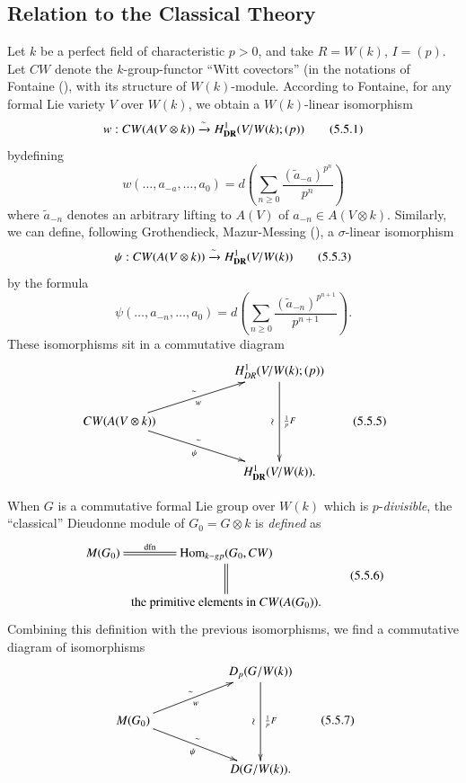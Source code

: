 \subsection{Relation to the Classical Theory}\label{art6-eq5.5}
Let $k$ be a perfect field of characteristic $p>0$, and take $R=W(k)$, $I=(p)$. Let $CW$ denote the $k$-group-functor ``Witt covectors'' (in the notations of Fontaine (\cite{art6-key13}), with its structure of $W(k)$-module. According to Fontaine, for any formal Lie variety $V$ over $W(k)$, we obtain a $W(k)$-linear isomorphism
\begin{equation*}
w:CW(A(V\otimes k))\xrightarrow{\sim}H^{1}_{\mathbf{DR}}(V/W(k);(p))\tag{5.5.1}\label{art6-eq5.5.1}
\end{equation*}
by\pageoriginale defining
\begin{equation*}
w(\ldots,a_{-a},\ldots,a_{0})=d\left(\sum\limits_{n\geq 0}\frac{(\widetilde{a}_{-a})^{p^{n}}}{p^{n}}\right)\tag{5.5.2}\label{art6-eq5.5.2}
\end{equation*}
where $\widetilde{a}_{-n}$ denotes an arbitrary lifting to $A(V)$ of $a_{-n}\in A(V\otimes k)$. Similarly, we can define, following Grothendieck, Mazur-Messing (\cite{art6-key35}), a $\sigma$-linear isomorphism
\begin{equation*}
\psi:CW(A(V\otimes k))\xrightarrow{\sim}H^{1}_{\mathbf{DR}}(V/W(k))\tag{5.5.3}\label{art6-eq5.5.3}
\end{equation*}
by the formula
\begin{equation*}
\psi(\ldots,a_{-n},\ldots,a_{0})=d\left(\sum\limits_{n\geq 0}\frac{(\widetilde{a}_{-n})^{p^{n+1}}}{p^{n+1}}\right).\tag{5.5.4}\label{art6-eq5.5.4}
\end{equation*}
These isomorphisms sit in a commutative diagram
\begin{equation*}
\vcenter{
\xymatrix@C=2cm{
 & H^{1}_{DR}(V/W(k);(p))\ar[dd]_-{\rotatebox{90}{$\sim$}}^-{\frac{1}{p}F}\\
CW(A(V\otimes k))\ar[dr]^-{\sim}_-{\psi} \ar[ur]^-{\sim}_-{w} &\\
 & H^{1}_{\DR}(V/W(k)).
}}\tag{5.5.5}\label{art6-eq5.5.5}
\end{equation*}

When $G$ is a commutative formal Lie group over $W(k)$ which is $p$-{\em divisible}, the ``classical'' Dieudonne module of $G_{0}=G\otimes k$ is {\em defined} as
\begin{equation*}
\vcenter{
\xymatrix@C=.1cm{
M(G_{0})\ar@{=}[r]^-{\text{dfn}} & \Hom_{k-gp}(G_{0},CW)\ar@{=}[d]\\
 & \text{the primitive elements in $CW(A(G_{0}))$.}
}}\tag{5.5.6}\label{art6-eq5.5.6}
\end{equation*}
Combining this definition with the previous isomorphisms, we find a commutative diagram of isomorphisms
\begin{equation*}
\vcenter{
\xymatrix@C=2cm{
 & D_{p}(G/W(k))\ar[dd]_-{\rotatebox{90}{$\sim$}}^-{\frac{1}{p}F}\\
M(G_{0})\ar[dr]^-{\sim}_-{\psi} \ar[ur]^-{\sim}_-{w} &\\
 & D(G/W(k)).
}}\tag{5.5.7}\label{art6-eq5.5.7}
\end{equation*}

